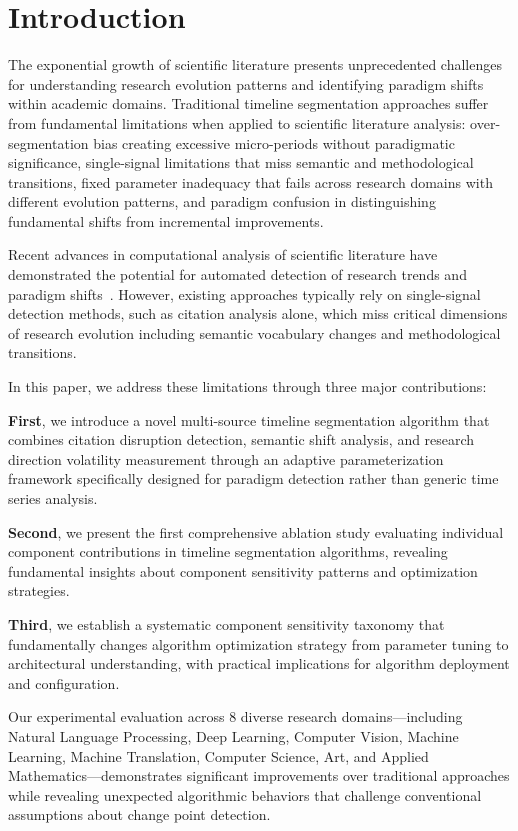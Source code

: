 \documentclass[conference]{IEEEtran}
\begin{document}
\section{Introduction}

The exponential growth of scientific literature presents unprecedented challenges for understanding research evolution patterns and identifying paradigm shifts within academic domains. Traditional timeline segmentation approaches suffer from fundamental limitations when applied to scientific literature analysis: over-segmentation bias creating excessive micro-periods without paradigmatic significance, single-signal limitations that miss semantic and methodological transitions, fixed parameter inadequacy that fails across research domains with different evolution patterns, and paradigm confusion in distinguishing fundamental shifts from incremental improvements.

Recent advances in computational analysis of scientific literature have demonstrated the potential for automated detection of research trends and paradigm shifts~\cite{fortunato2018science, chen2006citespace, boyack2010citation}. However, existing approaches typically rely on single-signal detection methods, such as citation analysis alone, which miss critical dimensions of research evolution including semantic vocabulary changes and methodological transitions.

In this paper, we address these limitations through three major contributions:

\textbf{First}, we introduce a novel multi-source timeline segmentation algorithm that combines citation disruption detection, semantic shift analysis, and research direction volatility measurement through an adaptive parameterization framework specifically designed for paradigm detection rather than generic time series analysis.

\textbf{Second}, we present the first comprehensive ablation study evaluating individual component contributions in timeline segmentation algorithms, revealing fundamental insights about component sensitivity patterns and optimization strategies.

\textbf{Third}, we establish a systematic component sensitivity taxonomy that fundamentally changes algorithm optimization strategy from parameter tuning to architectural understanding, with practical implications for algorithm deployment and configuration.

Our experimental evaluation across 8 diverse research domains—including Natural Language Processing, Deep Learning, Computer Vision, Machine Learning, Machine Translation, Computer Science, Art, and Applied Mathematics—demonstrates significant improvements over traditional approaches while revealing unexpected algorithmic behaviors that challenge conventional assumptions about change point detection.
\end{document}
